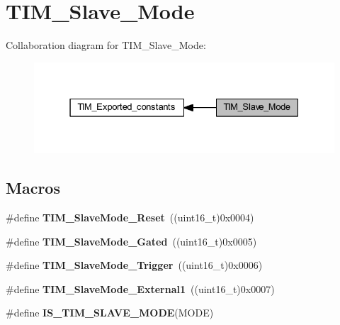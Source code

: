 \hypertarget{group___t_i_m___slave___mode}{}\section{T\+I\+M\+\_\+\+Slave\+\_\+\+Mode}
\label{group___t_i_m___slave___mode}
Collaboration diagram for T\+I\+M\+\_\+\+Slave\+\_\+\+Mode\+:\nopagebreak
\begin{figure}[H]
\begin{center}
\leavevmode
\includegraphics[width=331pt]{group___t_i_m___slave___mode}
\end{center}
\end{figure}
\subsection*{Macros}
\begin{DoxyCompactItemize}
\item 
\mbox{\label{group___t_i_m___slave___mode_gaac1cec731f1a5e680a038c4f472f74af}} 
\#define {\bfseries T\+I\+M\+\_\+\+Slave\+Mode\+\_\+\+Reset}~((uint16\+\_\+t)0x0004)
\item 
\mbox{\label{group___t_i_m___slave___mode_ga1f36c870b926f70b32f274bbc0bc39a5}} 
\#define {\bfseries T\+I\+M\+\_\+\+Slave\+Mode\+\_\+\+Gated}~((uint16\+\_\+t)0x0005)
\item 
\mbox{\label{group___t_i_m___slave___mode_ga9e7726c04ee1bafec97226f08adf5677}} 
\#define {\bfseries T\+I\+M\+\_\+\+Slave\+Mode\+\_\+\+Trigger}~((uint16\+\_\+t)0x0006)
\item 
\mbox{\label{group___t_i_m___slave___mode_ga34427a693157ab177fead9871185bd35}} 
\#define {\bfseries T\+I\+M\+\_\+\+Slave\+Mode\+\_\+\+External1}~((uint16\+\_\+t)0x0007)
\item 
\#define {\bfseries I\+S\+\_\+\+T\+I\+M\+\_\+\+S\+L\+A\+V\+E\+\_\+\+M\+O\+DE}(M\+O\+DE)
\end{DoxyCompactItemize}


